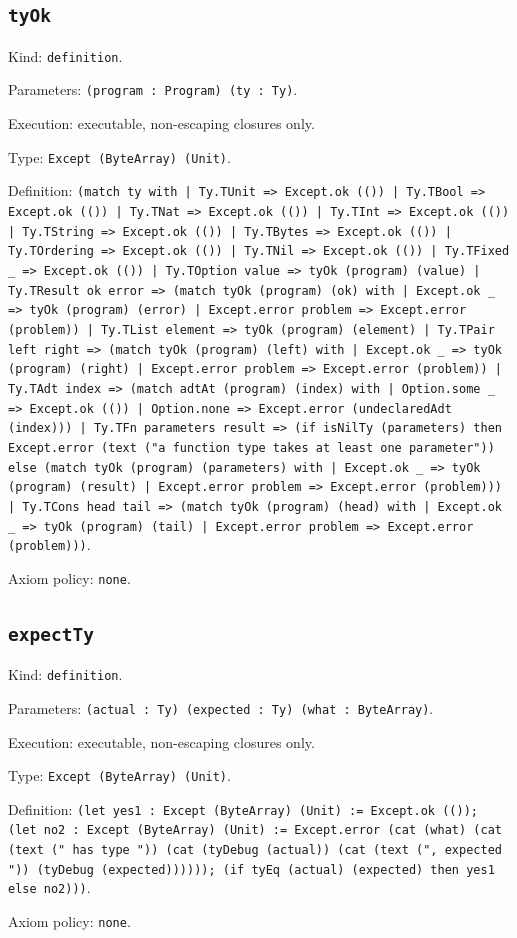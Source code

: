 \documentclass[11pt]{article}
\begin{document}
\subsection*{\texttt{tyOk}}
\noindent Kind: \texttt{definition}.\par
\noindent Parameters: \texttt{(program : Program) (ty : Ty)}.\par
\noindent Execution: executable, non-escaping closures only.\par
\noindent Type: \texttt{Except (ByteArray) (Unit)}.\par
\noindent Definition: \texttt{(match ty with | Ty.TUnit => Except.ok (()) | Ty.TBool => Except.ok (()) | Ty.TNat => Except.ok (()) | Ty.TInt => Except.ok (()) | Ty.TString => Except.ok (()) | Ty.TBytes => Except.ok (()) | Ty.TOrdering => Except.ok (()) | Ty.TNil => Except.ok (()) | Ty.TFixed \_ => Except.ok (()) | Ty.TOption value => tyOk (program) (value) | Ty.TResult ok error => (match tyOk (program) (ok) with | Except.ok \_ => tyOk (program) (error) | Except.error problem => Except.error (problem)) | Ty.TList element => tyOk (program) (element) | Ty.TPair left right => (match tyOk (program) (left) with | Except.ok \_ => tyOk (program) (right) | Except.error problem => Except.error (problem)) | Ty.TAdt index => (match adtAt (program) (index) with | Option.some \_ => Except.ok (()) | Option.none => Except.error (undeclaredAdt (index))) | Ty.TFn parameters result => (if isNilTy (parameters) then Except.error (text ("a function type takes at least one parameter")) else (match tyOk (program) (parameters) with | Except.ok \_ => tyOk (program) (result) | Except.error problem => Except.error (problem))) | Ty.TCons head tail => (match tyOk (program) (head) with | Except.ok \_ => tyOk (program) (tail) | Except.error problem => Except.error (problem)))}.\par
\noindent Axiom policy: \texttt{none}.\par
\subsection*{\texttt{expectTy}}
\noindent Kind: \texttt{definition}.\par
\noindent Parameters: \texttt{(actual : Ty) (expected : Ty) (what : ByteArray)}.\par
\noindent Execution: executable, non-escaping closures only.\par
\noindent Type: \texttt{Except (ByteArray) (Unit)}.\par
\noindent Definition: \texttt{(let yes1 : Except (ByteArray) (Unit) := Except.ok (()); (let no2 : Except (ByteArray) (Unit) := Except.error (cat (what) (cat (text (" has type ")) (cat (tyDebug (actual)) (cat (text (", expected ")) (tyDebug (expected)))))); (if tyEq (actual) (expected) then yes1 else no2)))}.\par
\noindent Axiom policy: \texttt{none}.\par
\end{document}
